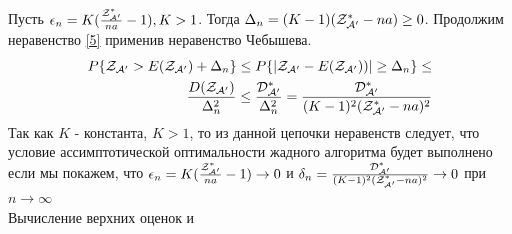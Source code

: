 \documentclass[a4paper, 14pt]{extarticle}
\begin{document}
Пусть $\epsilon_n = K(\frac{\text{$\mathcal{Z^*_{A'}}$}}{na}-1), K>1$.
Тогда $ \Delta_n = (K-1)(\text{$\mathcal{Z^*_{A'}}$}-na) \geq 0$.
Продолжим неравенство \eqref{5} применив неравенство Чебышева.
\begin{equation}\label{6}
\begin{aligned}
P\{\text{$\mathcal{Z_{A'}}$}> E(\text{$\mathcal{Z_{A'}}$})+ \Delta_n\} \leq 
P\{|\text{$\mathcal{Z_{A'}}$}- \text{$E(\text{$\mathcal{Z_{A'}}$})$})| \geq \Delta_n\} \leq \\
\frac{\text{$D(\text{$\mathcal{Z_{A'}}$})$}}{\Delta^2_n} \leq
\frac{\text{$\mathcal{D^*_{A'}}$}}{\Delta^2_n} = 
\frac{\text{$\mathcal{D^*_{A'}}$}}{(K-1)^2(\text{$\mathcal{Z^*_{A'}}$}-na)^2}
\end{aligned}
\end{equation}
Так как $K$ - константа, $K>1$, то из данной цепочки неравенств следует, что условие ассимптотической оптимальности жадного алгоритма будет выполнено если мы покажем, что
$ \epsilon_n=K(\frac{\text{$\mathcal{Z^*_{A'}}$}}{na}-1) \rightarrow 0$ и 
$ \delta_n = \frac{\text{$\mathcal{D^*_{A'}}$}}{(K-1)^2(\text{$\mathcal{Z^*_{A'}}$}-na)^2} \rightarrow 0$ при $ n \rightarrow \infty$\\

Вычисление верхних оценок \topboundE и \topboundD\\

\newcommand{\chanceLklesserX}{$\Phi_k(x)$}
\newcommand{\randomNormalValueE}{$l_k$}
\end{document}
